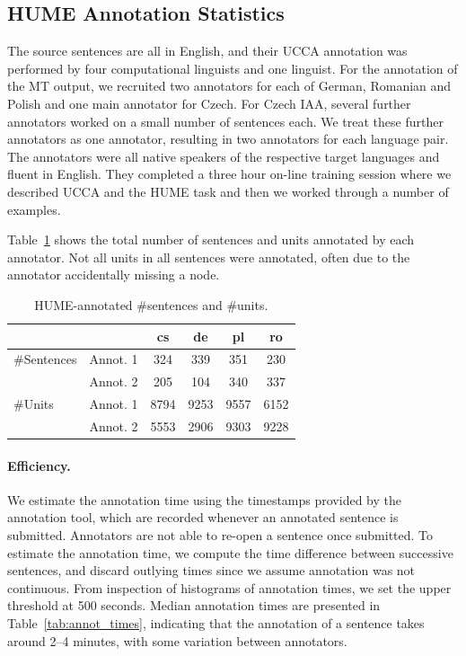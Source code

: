 \documentclass[11pt,letterpaper]{article}
\newcommand{\tabref}[1]{Table~\ref{#1}}
\begin{document}
\subsection{HUME Annotation Statistics}
\label{sec:annot_stats}

The source sentences are all in English, and their UCCA annotation was performed by four
computational linguists and one linguist.
For the annotation of the MT output, we recruited two annotators for each of German, Romanian
and Polish and one main annotator for Czech. For Czech IAA,
several further annotators worked on a small number of 
sentences each. We treat these further annotators as one annotator, resulting in two annotators
for each language pair.
The annotators were all native speakers of the respective target languages and fluent in English.
They completed a three hour on-line training session where we described UCCA and the HUME task and then
we worked through a number of examples. 


\tabref{tab:annot}
shows the total number of sentences and units annotated by each annotator.
Not all units in all sentences were annotated, often due to
the annotator %
accidentally missing a node.
\begin{table}
\begin{center}
{\small
\begin{tabular}{ll|cccc}
& & cs & de & pl & ro \\
\hline
\#Sentences &  Annot. 1 & 324   & 339  & 351  & 230  \\
 & Annot. 2 & 205 & 104  & 340  & 337 \\
\hline
\#Units & Annot. 1 & 8794  & 9253 & 9557  & 6152 \\
 &Annot. 2 & 5553 & 2906  & 9303  & 9228  \\
\end{tabular}
\caption{HUME-annotated \#sentences and \#units.}
\label{tab:annot}
}
\end{center}
\end{table}

\paragraph{Efficiency.}
We estimate the annotation time using the timestamps
provided by the annotation tool, which are recorded whenever an annotated sentence is
submitted. Annotators are not able to re-open a sentence once submitted. 
To estimate the annotation time, we compute the time difference between successive 
sentences, and discard outlying times since we assume annotation was not continuous.
From inspection of histograms of annotation times, we set the upper threshold at 500 seconds.
Median annotation times are presented in Table~\ref{tab:annot_times},
indicating that the annotation
of a sentence takes around 2--4 minutes, with some variation between annotators.
\end{document}
